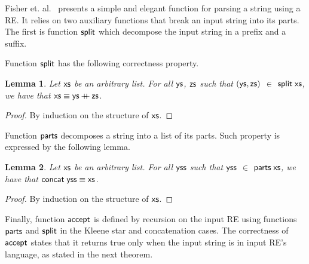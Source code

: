 \documentclass[oneside,12pt]{scrbook}
\newcommand{\plus}{\mathbin{+\!\!\!+}}
\def\resethooks{%
	\global\let\SaveRestoreHook\empty
	\global\let\ColumnHook\empty}
\let\hspre\empty
\let\hspost\empty
\newtheorem{Lemma}{Lemma}
\theoremstyle{definition}
\newcommand{\C}[1]{\red{\mathsf{#1}}}
\newcommand{\F}[1]{\green{\mathsf{#1}}}
\newcommand{\V}[1]{\black{\mathsf{#1}}}
\theoremstyle{plain}
\theoremstyle{definition}
\begin{document}
Fisher et. al.~\cite{Fischer2010} presents a simple and elegant function for parsing a string using a RE. It relies on two
auxiliary functions that break an input string into its parts. The first is function \ensuremath{\F{split}} which decompose the input string in
a prefix and a suffix.
\resethooks
Function \ensuremath{\F{split}} has the following correctness property.
\begin{Lemma}
	Let \ensuremath{\V{xs}} be an arbitrary list. For all \ensuremath{\V{ys}}, \ensuremath{\V{zs}} such that \ensuremath{(\V{ys},\V{zs})} $\in$ \ensuremath{\F{split}\;\V{xs}}, we have that \ensuremath{\V{xs}\equiv \V{ys}\plus \V{zs}}.
\end{Lemma}
\begin{proof}
	By induction on the structure of \ensuremath{\V{xs}}. 
\end{proof}
Function \ensuremath{\F{parts}} decomposes a string into a list of its parts. Such property is expressed by the following lemma.
\begin{Lemma}
	Let \ensuremath{\V{xs}} be an arbitrary list. For all \ensuremath{\V{yss}} such that \ensuremath{\V{yss}} $\in$ \ensuremath{\F{parts}\;\V{xs}}, we have that \ensuremath{\F{concat}\;\V{yss}\equiv \V{xs}}.
\end{Lemma}
\begin{proof}
	By induction on the structure of \ensuremath{\V{xs}}.
\end{proof}
Finally, function \ensuremath{\F{accept}} is defined by recursion on the input RE using functions \ensuremath{\F{parts}} and \ensuremath{\F{split}} in the
Kleene star and concatenation cases. The correctness of \ensuremath{\F{accept}} states that it returns true only when the
input string is in input RE's language, as stated in the next theorem.
\end{document}
